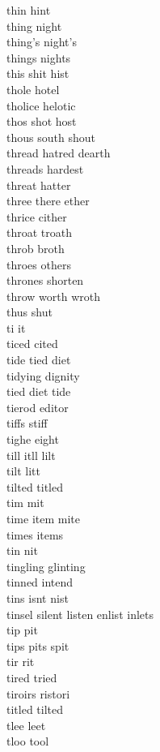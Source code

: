 thin hint\\
thing night\\
thing's night's\\
things nights\\
this shit hist\\
thole hotel\\
tholice helotic\\
thos shot host\\
thous south shout\\
thread hatred dearth\\
threads hardest\\
threat hatter\\
three there ether\\
thrice cither\\
throat troath\\
throb broth\\
throes others\\
thrones shorten\\
throw worth wroth\\
thus shut\\
ti it\\
ticed cited\\
tide tied diet\\
tidying dignity\\
tied diet tide\\
tierod editor\\
tiffs stiff\\
tighe eight\\
till itll lilt\\
tilt litt\\
tilted titled\\
tim mit\\
time item mite\\
times items\\
tin nit\\
tingling glinting\\
tinned intend\\
tins isnt nist\\
tinsel silent listen enlist inlets\\
tip pit\\
tips pits spit\\
tir rit\\
tired tried\\
tiroirs ristori\\
titled tilted\\
tlee leet\\
tloo tool\\
